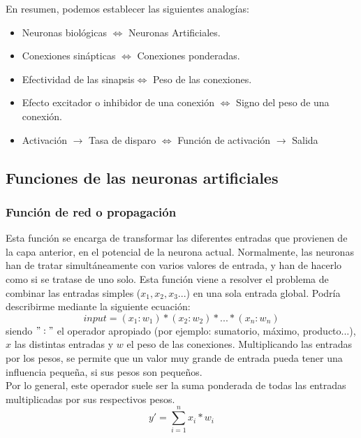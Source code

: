 En resumen, podemos establecer las siguientes analogías:
\begin{itemize}
\item Neuronas biológicas $\Longleftrightarrow$ Neuronas Artificiales.
\item Conexiones sinápticas $\Longleftrightarrow$ Conexiones ponderadas.
\item Efectividad de las sinapsis$\Longleftrightarrow$ Peso de las conexiones.
\item Efecto excitador o inhibidor de una conexión $\Longleftrightarrow$ Signo del peso de una
conexión.
\item Activación $\rightarrow$ Tasa de disparo $\Longleftrightarrow$ Función de activación $\rightarrow$ Salida
\end{itemize}

\subsection {Funciones de las neuronas artificiales}
\subsubsection {Función de red o propagación}
Esta función se encarga de transformar las diferentes entradas que provienen de la capa anterior, en el potencial de la neurona actual. Normalmente, las neuronas han de tratar simultáneamente con varios valores de entrada, y han de hacerlo como si se tratase de uno solo. Esta función viene a resolver el problema de combinar las entradas simples (${x_{1},x_{2},x_{3}...}$) en una sola entrada global. Podría describirme mediante la siguiente ecuación:
\begin{equation}
input = (x_{1}:w_{1})*(x_{2}:w_{2})*...*(x_{n}:w_{n})
\end{equation}
siendo ${":"}$ el operador apropiado (por ejemplo: sumatorio, máximo, producto...), ${x}$ las distintas entradas y ${w}$ el peso de las conexiones. Multiplicando las entradas por los pesos, se permite que un valor muy grande de entrada pueda tener una influencia pequeña, si sus pesos son pequeños.\\
Por lo general, este operador suele ser la suma ponderada de todas las entradas multiplicadas por sus respectivos pesos.
\begin{equation}\label{umbral_perceptron}
y' =  \sum_{i=1}^{n} x_{i} * w_{i}
\end{equation}
